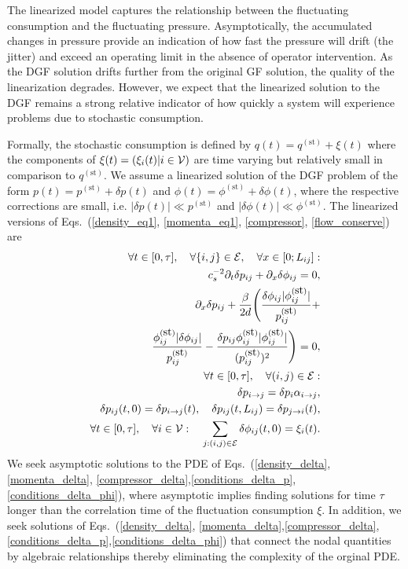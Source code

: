 \documentclass[10pt, conference, compsocconf]{IEEEtran}
\begin{document}
The linearized model captures the relationship between the fluctuating consumption and the fluctuating pressure. Asymptotically, the accumulated changes in pressure provide an indication of how fast the pressure will drift (the jitter) and exceed an operating limit in the absence of operator intervention. As the DGF solution drifts further from the original GF solution, the quality of the linearization degrades.  However, we expect that the linearized solution to the DGF remains a strong relative indicator of how quickly a system will experience problems due to stochastic consumption.


Formally, the stochastic consumption is defined by $q(t)=q^{(\mbox{st})}+\xi(t)$ where the components of $\xi(t)=(\xi_i(t)|i\in{\cal V})$ are time varying but relatively small in comparison to $q^{(\mbox{st})}$. We assume a linearized solution of the DGF problem of the form $p(t)=p^{(\mbox{st})}+\delta p(t)$ and $\phi(t)=\phi^{(\mbox{st})}+\delta \phi(t)$,  where the respective corrections are small, i.e. $|\delta p(t)|\ll p^{(\mbox{st})}$ and $|\delta \phi(t)|\ll \phi^{(\mbox{st})}$. The linearized versions of Eqs.~(\ref{density_eq1}, \ref{momenta_eq1}, \ref{compressor}, \ref{flow_conserve}) are
\begin{eqnarray}
&&\hspace{-0.5cm}\forall t\in [0,\tau],\quad \forall \{i,j\}\in{\cal E},\quad \forall x\in[0;L_{ij}]:\nonumber\\
&&c_s^{-2}\partial_t \delta p_{ij}+\partial_x \delta \phi_{ij}=0,\label{density_delta}\\
&& \partial_x \delta p_{ij}+\frac{\beta}{2d} \Biggl(\frac{\delta\phi_{ij} |\phi_{ij}^{(\mbox{st})}|}{p_{ij}^{(\mbox{st})}}+\nonumber\\ &&
\frac{\phi_{ij}^{(\mbox{st})} |\delta\phi_{ij}|}{p_{ij}^{(\mbox{st})}}-\frac{\delta p_{ij}\phi_{ij}^{(\mbox{st})} |\phi_{ij}^{(\mbox{st})}|}{(p_{ij}^{(\mbox{st})})^2}\Biggr)=0,\label{momenta_delta}\\
&&\hspace{-0.5cm}\forall t\in [0,\tau],\quad \forall (i,j)\in{\cal E}:\nonumber\\
&& \delta p_{i\to j}=\delta p_i \alpha_{i\to j} , \label{compressor_delta}\\
&& \delta p_{ij}(t,0)=\delta p_{i\to j}(t),\quad \delta p_{ij}(t,L_{ij})= \delta p_{j\to i}(t),\label{conditions_delta_p}\\
&&\hspace{-0.5cm}\forall t\in [0,\tau],\quad \forall i\in{\cal V}:\quad
\sum_{j:(i,j)\in{\cal E}}\delta \phi_{ij}(t,0)=\xi_i(t).
\label{conditions_delta_phi}
\end{eqnarray}
We seek asymptotic solutions to the PDE of Eqs.~(\ref{density_delta}, \ref{momenta_delta}, \ref{compressor_delta},\ref{conditions_delta_p},\ref{conditions_delta_phi}), where asymptotic implies finding solutions for time $\tau$ longer than the correlation time of the fluctuation consumption $\xi$. In addition, we seek solutions of Eqs.~(\ref{density_delta}, \ref{momenta_delta},\ref{compressor_delta},\ref{conditions_delta_p},\ref{conditions_delta_phi}) that connect the nodal quantities by algebraic relationships thereby eliminating the complexity of the orginal PDE.
\end{document}
